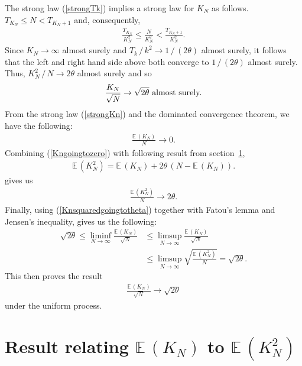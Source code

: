 \documentclass[twoside]{article}
\begin{document}
The strong law (\ref{strongTk}) implies a strong law for $K_N$ as
follows. $T_{K_N} \leq N < T_{K_N + 1}$ and, consequently,
\begin{align*}
\frac{T_{K_N}}{K_N^2} \leq \frac{N}{K_N^2} < \frac{T_{K_N +
1}}{K_N^2}.
\end{align*}
Since $K_N \to \infty$ almost surely and $T_k\,/\,k^2 \to
1\,/\,(2\theta)$ almost surely, it follows that the left and right
hand side above both converge to $1\,/\,(2\theta)$ almost surely.
Thus, $K_N^2 \,/\, N \to 2\theta$ almost surely and so
\begin{align}
\frac{K_N}{\sqrt{N}} \to \sqrt{2\theta} \hbox{ almost surely.}   \label{strongKn}
\end{align}
From the strong law (\ref{strongKn}) and the dominated convergence
theorem, we have the following:
\begin{align}
\frac{\mathbb{E}\,(K_N)}{N} \to 0.  \label{Kngoingtozero}
\end{align}
Combining (\ref{Kngoingtozero}) with following result from
section~\ref{momentlemma},
\begin{align}
\mathbb{E}\,(K_N^2) = \mathbb{E}\,(K_N) + 2\theta\,(N - \mathbb{E}\,(K_N)). \label{twomoments}
\end{align}
gives us
\begin{align}
\frac{\mathbb{E}\,(K_N^2)}{N} \to 2\theta. \label{Knsquaredgoingtotheta}
\end{align}
Finally, using (\ref{Knsquaredgoingtotheta}) together with Fatou's
lemma and Jensen's inequality, gives us the following:
\begin{align*}
\sqrt{2\theta} \leq \liminf_{N \to \infty} \frac{\mathbb{E}\,(K_N)}{\sqrt{N}} & \leq
\limsup_{N \to \infty} \frac{\mathbb{E}\,(K_N)}{\sqrt{N}} \nonumber\\
&\leq \limsup_{N \to
\infty} \sqrt{\frac{\mathbb{E}\,(K_N^2)}{N}} = \sqrt{2\theta}.
\end{align*}
This then proves the result
\begin{align*}
\frac{\mathbb{E}\,(K_N)}{\sqrt{N}} \to \sqrt{2\theta}
\end{align*}
under the uniform process. 

\section{Result relating $\mathbb{E}\,(K_N)$ to  $\mathbb{E}\,(K_N^2)$} \label{momentlemma}
\end{document}
